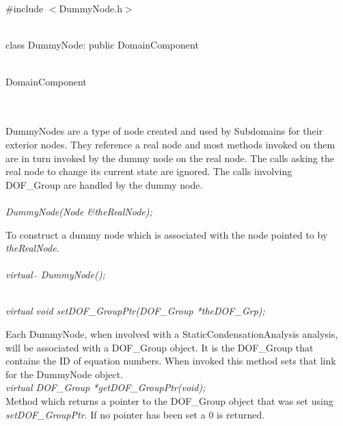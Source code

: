 
 \\

   \\
\#include $<$DummyNode.h$>$  


  \\
class DummyNode: public DomainComponent  




 \\
DomainComponent 

\indent{} \\

  \\
\indent DummyNodes are a type of node created and used by Subdomains for their
exterior nodes. They reference a real node and most methods invoked on
them are in turn invoked by the dummy node on the real node. The calls
asking the real node to change its current state are ignored. The
calls involving DOF\_Group are handled by the dummy node. \\


  \\
{\em DummyNode(Node &theRealNode);}  

To construct a dummy node which is associated with the node pointed to
by {\em theRealNode}. \\

  \\
{\em virtual~$\tilde{}$ DummyNode();} 


  \\
{\em virtual void setDOF\_GroupPtr(DOF\_Group *theDOF\_Grp);} 

Each DummyNode, when involved with a StaticCondensationAnalysis
analysis, will be associated with a DOF\_Group object. It is the
DOF\_Group that contains the ID of equation numbers. When invoked this
method sets that link for the DummyNode object. \\ 


{\em virtual DOF\_Group *getDOF\_GroupPtr(void);} \\
Method which returns a pointer to the DOF\_Group object that was set
using {\em setDOF\_GroupPtr}. If no pointer has been set a $0$ is
returned. \\


